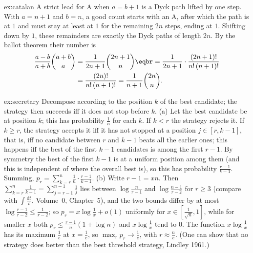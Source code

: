 \begin{solution}{ex:catalan}
\idea A strict lead for A when $a=b+1$ is a Dyck path lifted by one step.
\writeup With $a=n+1$ and $b=n$, a good count starts with an A, after which the path is at $1$ and must stay at
least at $1$ for the remaining $2n$ steps, ending at $1$. Shifting down by $1$, these remainders are exactly the
Dyck paths of length $2n$. By the ballot theorem their number is
\[
\begin{aligned}\frac{a-b}{a+b}\binom{a+b}a&=\frac1{2n+1}\binom{2n+1}{n}\eqbr=\frac1{2n+1}\cdot\frac{(2n+1)!}{n!\,(n+1)!}\\&=\frac{(2n)!}{n!\,(n+1)!}=\frac1{n+1}\binom{2n}n.\end{aligned}
\]
\end{solution}

\begin{solution}{ex:secretary}
\idea Decompose according to the position $k$ of the best candidate; the strategy then succeeds iff it does not
stop before $k$.
\writeup (a) Let the best candidate be at position $k$; this has probability $\frac1n$ for each $k$. If $k<r$ the
strategy rejects it. If $k\ge r$, the strategy accepts it iff it has not stopped at a position $j\in[r,k-1]$, that
is, iff no candidate between $r$ and $k-1$ beats all the earlier ones; this happens iff the best of the first $k-1$
candidates is among the first $r-1$. By symmetry the best of the first $k-1$ is at a uniform position among
them (and this is independent of where the overall best is), so this has probability $\frac{r-1}{k-1}$. Summing,
$p_r=\sum_{k=r}^n\frac1n\cdot\frac{r-1}{k-1}$.
(b) Write $r-1=xn$. Then $\sum_{k=r}^n\frac1{k-1}=\sum_{j=r-1}^{n-1}\frac1j$ lies between $\log\frac n{r-1}$ and
$\log\frac{n-1}{r-2}$ for $r\ge3$ (compare with $\int\frac{\mathrm dt}t$, Volume~0, Chapter~5), and the two bounds differ by at most $\log\frac{r-1}{r-2}\le\frac1{r-2}$; so $p_r=x\log\frac1x+o(1)$
uniformly for $x\in[\frac1{\sqrt n},1]$, while for smaller $x$ both $p_r\le\frac{r-1}n(1+\log n)$ and
$x\log\frac1x$ tend to $0$. The function $x\log\frac1x$ has its maximum $\frac1e$ at $x=\frac1e$, so
$\max_rp_r\to\frac1e$, with $r\approx\frac ne$. (One can show that no strategy does better than the best threshold
strategy, Lindley 1961.)
\end{solution}

